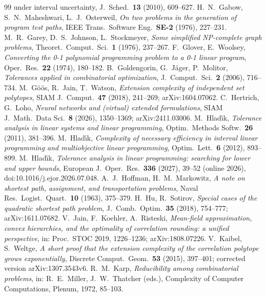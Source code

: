 \documentclass[11pt]{amsart}
\theoremstyle{plain}
\theoremstyle{definition}
\theoremstyle{remark}
\begin{document}
\begin{thebibliography}{99}
{  under interval uncertainty}, J.\ Sched.\ \textbf{13} (2010), 609--627.
 H.~N.~Gabow, S.~N.~Maheshwari, L.~J.~Osterweil, \emph{On two problems in the generation of program
  test paths}, IEEE Trans.\ Software Eng.\ \textbf{SE-2} (1976), 227--231.
 M.~R.~Garey, D.~S.~Johnson, L.~Stockmeyer, \emph{Some simplified NP-complete graph problems},
  Theoret.\ Comput.\ Sci.\ \textbf{1} (1976), 237--267.
 F.~Glover, E.~Woolsey, \emph{Converting the 0-1 polynomial programming problem to a 0-1 linear
  program}, Oper.\ Res.\ \textbf{22} (1974), 180--182.
 B.~Goldengorin, G.~J\"ager, P.~Molitor, \emph{Tolerances applied in combinatorial optimization},
  J.\ Comput.\ Sci.\ \textbf{2} (2006), 716--734.
 M.~G\"o\"os, R.~Jain, T.~Watson, \emph{Extension complexity of independent set polytopes}, SIAM J.\
  Comput.\ \textbf{47} (2018), 241--269; arXiv:1604.07062.
 C.~Hertrich, G.~Loho, \emph{Neural networks and (virtual) extended formulations}, SIAM J.\ Math.\ Data
  Sci.\ \textbf{8} (2026), 1350--1369; arXiv:2411.03006.
 M.~Hlad\'{\i}k, \emph{Tolerance analysis in linear systems and linear programming}, Optim.\
  Methods Softw.\ \textbf{26} (2011), 381--396.
\bibitem{Hladik12} M.~Hlad\'{\i}k, \emph{Complexity of necessary efficiency in interval linear programming and
  multiobjective linear programming}, Optim.\ Lett.\ \textbf{6} (2012), 893--899.
\bibitem{Hladik26} M.~Hlad\'{\i}k, \emph{Tolerance analysis in linear programming: searching for lower and upper
  bounds}, European J.\ Oper.\ Res.\ \textbf{336} (2027), 39--52 (online 2026), doi:10.1016/j.ejor.2026.07.048.
\bibitem{HM} A.~J.~Hoffman, H.~M.~Markowitz, \emph{A note on shortest path, assignment, and transportation
  problems}, Naval Res.\ Logist.\ Quart.\ \textbf{10} (1963), 375--379.
\bibitem{HuSotirov} H.~Hu, R.~Sotirov, \emph{Special cases of the quadratic shortest path problem}, J.\ Comb.\
  Optim.\ \textbf{35} (2018), 754--777; arXiv:1611.07682.
\bibitem{JKR} V.~Jain, F.~Koehler, A.~Risteski, \emph{Mean-field approximation, convex hierarchies, and the
  optimality of correlation rounding: a unified perspective}, in: Proc.\ STOC 2019, 1226--1236; arXiv:1808.07226.
\bibitem{KW} V.~Kaibel, S.~Weltge, \emph{A short proof that the extension complexity of the correlation polytope
  grows exponentially}, Discrete Comput.\ Geom.\ \textbf{53} (2015), 397--401; corrected version arXiv:1307.3543v6.
\bibitem{Karp} R.~M.~Karp, \emph{Reducibility among combinatorial problems}, in: R.~E.~Miller, J.~W.~Thatcher (eds.),
  Complexity of Computer Computations, Plenum, 1972, 85--103.

\end{thebibliography}
\end{document}
